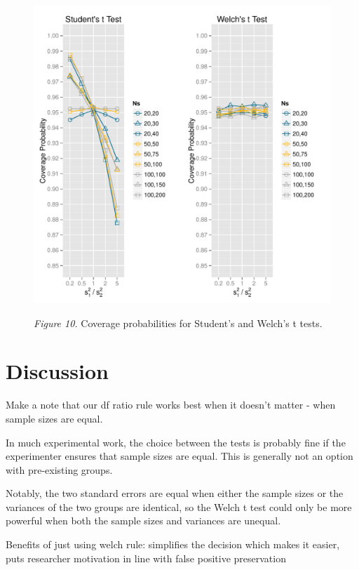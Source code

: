 \documentclass[man,a4paper,noextraspace,apacite]{apa6}\usepackage[]{graphicx}\usepackage[]{color}
\makeatletter
\def\maxwidth{ %
  \ifdim\Gin@nat@width>\linewidth
    \linewidth
  \else
    \Gin@nat@width
  \fi
}
\newenvironment{knitrout}{}{} %
\makeatother
\begin{document}
\begin{figure}
\begin{knitrout}
\color{fgcolor}
\includegraphics[width=\maxwidth]{figure/coverage_plots} 

\end{knitrout}
\textit{Figure 10.} Coverage probabilities for Student's and Welch's t tests.
\end{figure}

\section{Discussion}
    Make a note that our df ratio rule works best when it doesn't matter - when sample sizes are equal.
    
    In much experimental work, the choice between the tests is probably fine if the experimenter ensures that sample sizes are equal. This is generally not an option with pre-existing groups. 
    
    Notably, the two standard errors are equal when either the sample sizes or the variances of the two groups are identical, so the Welch t test could only be more powerful when both the sample sizes and variances are unequal. 
    
    Benefits of just using welch rule: simplifies the decision which makes it easier, puts researcher motivation in line with false positive preservation
\end{document}

